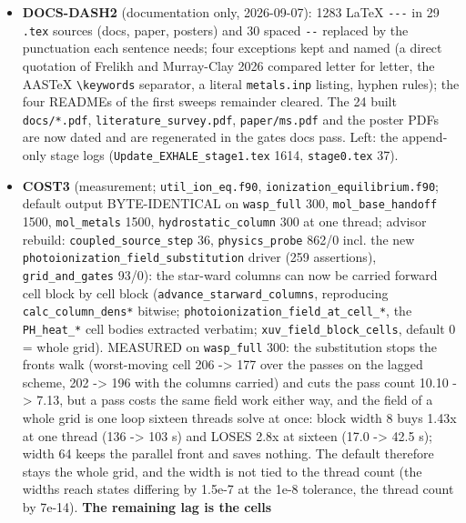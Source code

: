 \documentclass[english,a4paper]{my_memo}
\begin{document}
\begin{itemize}
  \texttt{backup/} (5) outside the first sweep\textquotesingle s paths.
\item
  \textbf{DOCS-DASH2} (documentation only, 2026-09-07): 1283 LaTeX \texttt{-\/-\/-} in 29
  \texttt{.tex} sources (docs, paper, posters) and 30 spaced \texttt{-\/-} replaced by the
  punctuation each sentence needs; four exceptions kept and named (a direct
  quotation of Frelikh and Murray-Clay 2026 compared letter for letter, the
  AASTeX \texttt{\textbackslash{}keywords} separator, a literal \texttt{metals.inp} listing, hyphen rules);
  the four READMEs of the first sweep\textquotesingle s remainder cleared. The 24 built
  \texttt{docs/*.pdf}, \texttt{literature\_survey.pdf}, \texttt{paper/ms.pdf} and the poster PDFs
  are now dated and are regenerated in the gate\textquotesingle s docs pass. Left: the
  append-only stage logs (\texttt{Update\_EXHALE\_stage1.tex} 1614, \texttt{stage0.tex} 37).
\item
  \textbf{COST3} (measurement; \texttt{util\_ion\_eq.f90}, \texttt{ionization\_equilibrium.f90};
  default output BYTE-IDENTICAL on \texttt{wasp\_full} 300, \texttt{mol\_base\_handoff} 1500,
  \texttt{mol\_metals} 1500, \texttt{hydrostatic\_column} 300 at one thread; advisor rebuild:
  \texttt{coupled\_source\_step} 36, \texttt{physics\_probe} 862/0 incl. the new
  \texttt{photoionization\_field\_substitution} driver (259 assertions),
  \texttt{grid\_and\_gates} 93/0): the star-ward columns can now be carried forward
  cell block by cell block (\texttt{advance\_starward\_columns}, reproducing
  \texttt{calc\_column\_dens*} bitwise; \texttt{photoionization\_field\_at\_cell\_*}, the
  \texttt{PH\_heat\_*} cell bodies extracted verbatim; \texttt{xuv\_field\_block\_cells},
  default 0 = whole grid). MEASURED on \texttt{wasp\_full} 300: the substitution
  stops the front\textquotesingle s walk (worst-moving cell 206 -\textgreater{} 177 over the passes on
  the lagged scheme, 202 -\textgreater{} 196 with the columns carried) and cuts the pass
  count 10.10 -\textgreater{} 7.13, but a pass costs the same field work either way, and
  the field of a whole grid is one loop sixteen threads solve at once: block
  width 8 buys 1.43x at one thread (136 -\textgreater{} 103 s) and LOSES 2.8x at sixteen
  (17.0 -\textgreater{} 42.5 s); width 64 keeps the parallel front and saves nothing. The
  default therefore stays the whole grid, and the width is not tied to the
  thread count (the widths reach states differing by 1.5e-7 at the 1e-8
  tolerance, the thread count by 7e-14). \textbf{The remaining lag is the cell\textquotesingle s
}
\end{itemize}
\end{document}
